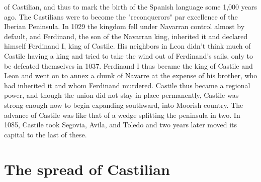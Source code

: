 \documentclass[14pt,a4paper,oneside]{memoir}
\begin{document}
{{{{of Castilian, and thus to mark the birth of the Spanish language some
1,000 years ago.
The Castilians were to become the "reconquerors" par excellence of the Iberian Peninsula. In 1029 the kingdom fell under Navarran control almost by default, and Ferdinand, the son of the Navarran
king, inherited it and declared himself Ferdinand I, king of Castile. His
neighbors in Leon didn't think much of Castile having a king and tried
to take the wind out of Ferdinand's sails, only to be defeated themselves in 1037. Ferdinand I thus became the king of Castile and Leon
and went on to annex a chunk of Navarre at the expense of his brother,
who had inherited it and whom Ferdinand murdered.
Castile thus became a regional power, and though the union
did not stay in place permanently, Castile was strong enough now
to begin expanding southward, into Moorish country. The advance
of Castile was like that of a wedge splitting the peninsula in two.
In 1085, Castile took Segovia, Avila, and Toledo and two years later
moved its capital to the last of these.

\section{The spread of Castilian}

}}}}
\end{document}
